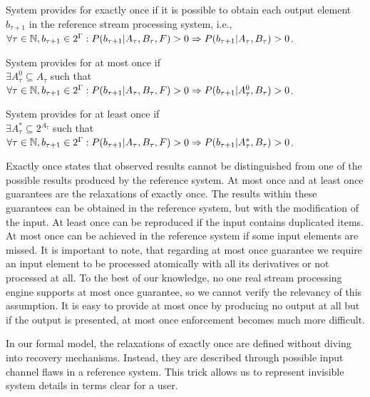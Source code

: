 \begin{definition}{System provides for exactly once}
if it is possible to obtain each output element $b_{\tau+1}$ in the reference stream processing system, i.e.,\\ 
$\forall{\tau \in \mathbb{N}}, b_{\tau+1}\in 2^{\Gamma}: P(b_{\tau+1}|A_{\tau},B_\tau,F)>0 \Rightarrow \\ P(b_{\tau+1}|A_{\tau},B_\tau)>0$.
\end{definition}

\begin{definition}{System provides for at most once}
if \\
$\exists{A^{0}_{\tau}\subseteq{A_{\tau}}}$ such that \\
$\forall{\tau \in \mathbb{N},{b_{\tau+1}\in 2^{\Gamma}}}: P(b_{\tau+1}|A_{\tau},B_\tau,F)>0 \Rightarrow \\ P(b_{\tau+1}|A^{0}_{\tau},B_\tau)>0$.
\end{definition}

\begin{definition}{System provides for at least once}
if \\
$\exists{A^{*}_{\tau}\subseteq{2^{A_{\tau}}}}$ such that \\
$\forall{\tau \in \mathbb{N}, {b_{\tau+1} \in 2^{\Gamma}}}: P(b_{\tau+1}|A_{\tau},B_\tau,F)>0 \Rightarrow \\ P(b_{\tau+1}|A^{*}_{\tau},B_\tau)>0$.
\end{definition}

Exactly once states that observed results cannot be distinguished from one of the possible results produced by the reference system. At most once and at least once guarantees are the relaxations of exactly once. The results within these guarantees can be obtained in the reference system, but with the modification of the input. At least once can be reproduced if the input contains duplicated items. At most once can be achieved in the reference system if some input elements are missed. It is important to note, that regarding at most once guarantee we require an input element to be processed atomically with all its derivatives or not processed at all. To the best of our knowledge, no one real stream processing engine supports at most once guarantee, so we cannot verify the relevancy of this assumption. It is easy to provide at most once by producing no output at all but if the output is presented, at most once enforcement becomes much more difficult.  

In our formal model, the relaxations of exactly once are defined without diving into recovery mechanisms. Instead, they are described through possible input channel flaws in a reference system. This trick allows us to represent invisible system details in terms clear for a user.

